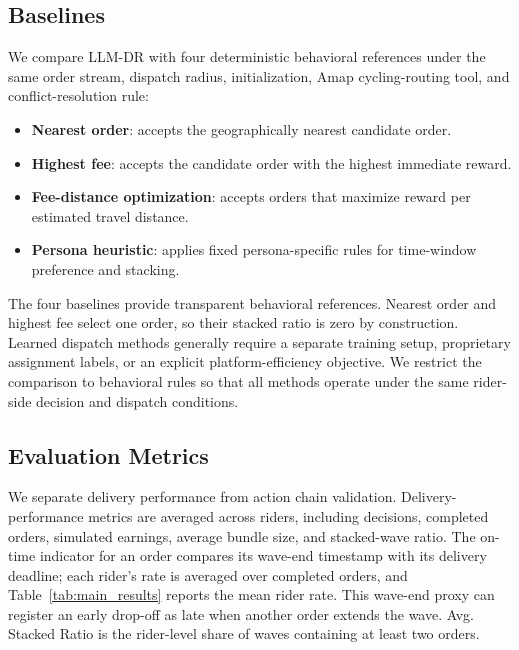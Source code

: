 \documentclass[letterpaper,journal]{IEEEtran}
\begin{document}
\subsection{Baselines}
We compare LLM-DR with four deterministic behavioral references under the same order stream, dispatch radius, initialization, Amap cycling-routing tool, and conflict-resolution rule:
\begin{itemize}
    \item \textbf{Nearest order}: accepts the geographically nearest candidate order.
    \item \textbf{Highest fee}: accepts the candidate order with the highest immediate reward.
    \item \textbf{Fee-distance optimization}: accepts orders that maximize reward per estimated travel distance.
    \item \textbf{Persona heuristic}: applies fixed persona-specific rules for time-window preference and stacking.
\end{itemize}

The four baselines provide transparent behavioral references. Nearest order and highest fee select one order, so their stacked ratio is zero by construction. Learned dispatch methods generally require a separate training setup, proprietary assignment labels, or an explicit platform-efficiency objective. We restrict the comparison to behavioral rules so that all methods operate under the same rider-side decision and dispatch conditions.

\subsection{Evaluation Metrics}
We separate delivery performance from action chain validation. Delivery-performance metrics are averaged across riders, including decisions, completed orders, simulated earnings, average bundle size, and stacked-wave ratio. The on-time indicator for an order compares its wave-end timestamp with its delivery deadline; each rider's rate is averaged over completed orders, and Table~\ref{tab:main_results} reports the mean rider rate. This wave-end proxy can register an early drop-off as late when another order extends the wave. Avg. Stacked Ratio is the rider-level share of waves containing at least two orders.
\end{document}

